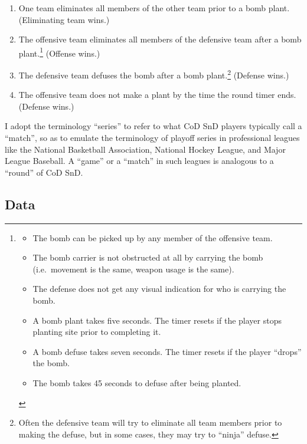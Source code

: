 \documentclass{article}
\providecommand{\tightlist}{%
  \setlength{\itemsep}{0pt}\setlength{\parskip}{0pt}}
\begin{document}
\begin{enumerate}
\def\labelenumi{\arabic{enumi}.}
\tightlist
\item
  One team eliminates all members of the other team prior to a bomb
  plant. (Eliminating team wins.)
\item
  The offensive team eliminates all members of the defensive team after
  a bomb plant.\footnote{\begin{itemize}
    \tightlist
    \item
      The bomb can be picked up by any member of the offensive team.
    \item
      The bomb carrier is not obstructed at all by carrying the bomb
      (i.e.~movement is the same, weapon usage is the same).
    \item
      The defense does not get any visual indication for who is carrying
      the bomb.
    \item
      A bomb plant takes five seconds. The timer resets if the player
      stops planting site prior to completing it.
    \item
      A bomb defuse takes seven seconds. The timer resets if the player
      ``drops'' the bomb.
    \item
      The bomb takes 45 seconds to defuse after being planted.
    \end{itemize}} (Offense wins.)
\item
  The defensive team defuses the bomb after a bomb plant.\footnote{Often
    the defensive team will try to eliminate all team members prior to
    making the defuse, but in some cases, they may try to ``ninja''
    defuse.} (Defense wins.)
\item
  The offensive team does not make a plant by the time the round timer
  ends. (Defense wins.)
\end{enumerate}

I adopt the terminology ``series'' to refer to what CoD SnD players
typically call a ``match'', so as to emulate the terminology of playoff
series in professional leagues like the National Basketball Association,
National Hockey League, and Major League Baseball. A ``game'' or a
``match'' in such leagues is analogous to a ``round'' of CoD SnD.

\hypertarget{data}{%
\subsection{Data}\label{data}}
\end{document}
